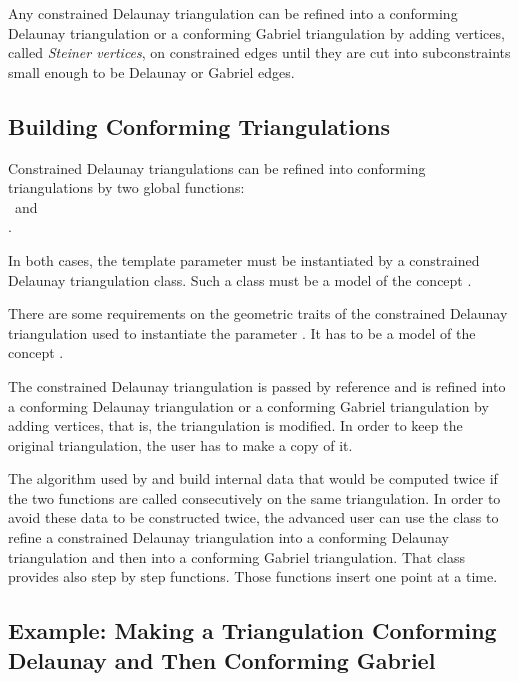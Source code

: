 Any constrained Delaunay triangulation can be refined into a
conforming Delaunay triangulation or a conforming Gabriel
triangulation by adding vertices, called \emph{Steiner vertices}, on
constrained edges until they are cut into subconstraints small enough
to be Delaunay or Gabriel edges.

\subsection{Building Conforming Triangulations}
\label{sec:Mesh_2_building_conforming}

Constrained Delaunay triangulations can be refined into
conforming triangulations 
by two global functions: \\
~and\\
. 

In both cases, the template parameter  must be instantiated
by a constrained Delaunay triangulation class.  Such a class must be a
model of the concept .

There are some requirements on the geometric traits of the constrained
Delaunay triangulation used to instantiate the parameter .
It has to be a model of the concept
.

The constrained Delaunay triangulation  is passed by reference
and is refined into a conforming Delaunay triangulation or a
conforming Gabriel triangulation by adding vertices, that is, the
triangulation is modified. In order to keep the original
triangulation, the user has to make a copy of it.

The algorithm used by  and
 build internal data that would be
computed twice if the two functions are called consecutively on the same
triangulation. In order to avoid these data to be constructed twice, the
advanced user can use the class  to
refine a constrained Delaunay triangulation into a conforming Delaunay
triangulation and then into a conforming Gabriel triangulation. That class
provides also step by step functions. Those functions insert one point at a
time.

\subsection{Example: Making a Triangulation Conforming Delaunay and Then
  Conforming Gabriel}
\label{sec:Mesh_2_example_making_conforming}

